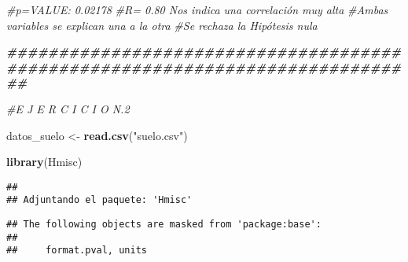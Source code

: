 \documentclass[
]{article}
\newenvironment{Shaded}{\begin{snugshade}}{\end{snugshade}}
\newcommand{\CommentTok}[1]{\textcolor[rgb]{0.56,0.35,0.01}{\textit{#1}}}
\newcommand{\DocumentationTok}[1]{\textcolor[rgb]{0.56,0.35,0.01}{\textbf{\textit{#1}}}}
\newcommand{\FunctionTok}[1]{\textcolor[rgb]{0.13,0.29,0.53}{\textbf{#1}}}
\newcommand{\NormalTok}[1]{#1}
\newcommand{\OtherTok}[1]{\textcolor[rgb]{0.56,0.35,0.01}{#1}}
\newcommand{\StringTok}[1]{\textcolor[rgb]{0.31,0.60,0.02}{#1}}
\begin{document}
\begin{Shaded}
\begin{Highlighting}[]
\CommentTok{\#p=VALUE:  0.02178 }
\CommentTok{\#R= 0.80 Nos indica una correlación muy alta }
\CommentTok{\#Ambas variables se explican una a la otra }
\CommentTok{\#Se rechaza la Hipótesis nula }

\DocumentationTok{\#\#\#\#\#\#\#\#\#\#\#\#\#\#\#\#\#\#\#\#\#\#\#\#\#\#\#\#\#\#\#\#\#\#\#\#\#\#\#\#\#\#\#\#\#\#\#\#\#\#\#\#\#\#\#\#\#\#\#\#\#\#\#\#\#\#\#\#\#\#\#\#\#\#\#\#\#\#}

\CommentTok{\#E J E R C I C I O N.2 }

\NormalTok{datos\_suelo }\OtherTok{\textless{}{-}} \FunctionTok{read.csv}\NormalTok{(}\StringTok{"suelo.csv"}\NormalTok{)}

\FunctionTok{library}\NormalTok{(Hmisc)}
\end{Highlighting}
\end{Shaded}

\begin{verbatim}
## 
## Adjuntando el paquete: 'Hmisc'
\end{verbatim}

\begin{verbatim}
## The following objects are masked from 'package:base':
## 
##     format.pval, units
\end{verbatim}
\end{document}
